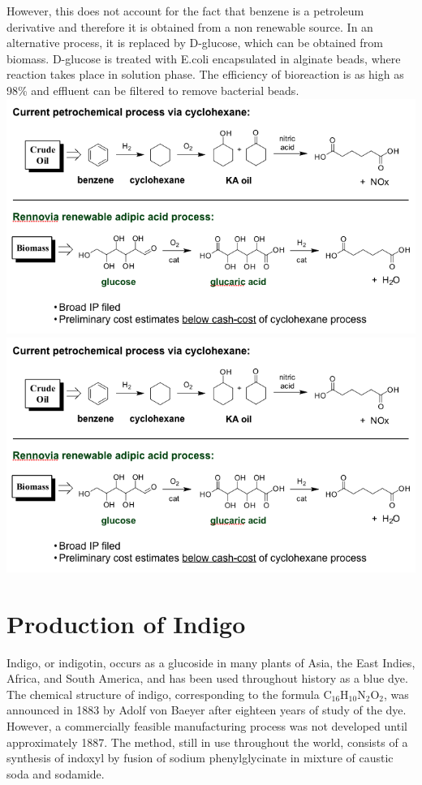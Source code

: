 \documentclass[pdftex,12pt,a4paper]{article}
\begin{document}
However, this does not account for the fact that benzene is a petroleum derivative and therefore it is obtained from a non renewable source. In an alternative process, it is replaced by D-glucose, which can be obtained from biomass. D-glucose is treated with E.coli encapsulated in alginate beads, where reaction takes place in solution phase. The efficiency of bioreaction is as high as 98\% and effluent can be filtered to remove bacterial beads.\\
\includegraphics[clip=true,trim=0pt 250pt 0pt 40pt,scale=0.6]{25febi2.png}
\\
\includegraphics[clip=true,trim=0pt 70pt 0pt 220pt,scale=0.6]{25febi2.png}
\section{Production of Indigo}
Indigo, or indigotin, occurs as a glucoside in many plants of Asia, the East Indies, Africa, and South America, and has been used throughout history as a blue dye. The chemical structure of indigo, corresponding to the formula C$_{16}$H$_{10}$N$_2$O$_2$, was announced in 1883 by Adolf von Baeyer after eighteen years of study of the dye. However, a commercially feasible manufacturing process was not developed until approximately 1887. The method, still in use throughout the world, consists of a synthesis of indoxyl by fusion of sodium phenylglycinate in mixture of caustic soda and sodamide.\\
\end{document}
